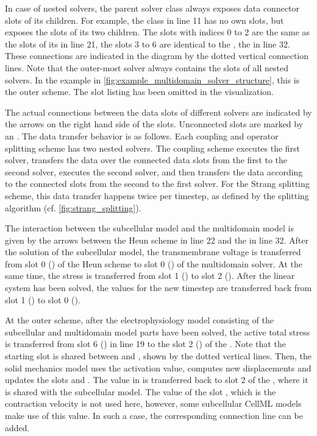 In case of nested solvers, the parent solver class always exposes data connector slots of its children. For example, the  class in line 11 has no own slots, but exposes the slots of its two children. The slots with indices 0 to 2 are the same as the slots of its  in line 21, the slots 3 to 6 are identical to the , the  in line 32. These connections are indicated in the diagram by the dotted vertical connection lines.
Note that the outer-most solver always contains the slots of all nested solvers. In the example in \cref{fig:example_multidomain_solver_structure}, this is the outer  scheme. The slot listing has been omitted in the visualization.

The actual connections between the data slots of different solvers are indicated by the arrows on the right hand side of the slots. Unconnected slots are marked by an .
The data transfer behavior is as follows. Each coupling and operator splitting scheme has two nested solvers. The coupling scheme executes the first solver, transfers the data over the connected data slots from the first to the second solver, executes the second solver, and then transfers the data according to the connected slots from the second to the first solver. For the Strang splitting scheme, this data transfer happens twice per timestep, as defined by the splitting algorithm (cf. \cref{fig:strang_splitting}).

The interaction between the subcellular model and the multidomain model is given by the arrows between the Heun scheme in line 22 and the  in line 32. After the solution of the subcellular model, the transmembrane voltage is transferred from slot 0 () of the Heun scheme to slot 0 () of the multidomain solver. At the same time, the stress is transferred from slot 1 () to slot 2 (). After the linear system has been solved, the values for the new timestep are transferred back from slot 1 () to slot 0 ().

At the outer  scheme, after the electrophysiology model consisting of the subcellular and multidomain model parts have been solved, the active total stress is transferred from slot 6 () in line 19 to the slot 2 () of the . Note that the starting slot  is shared between  and , shown by the dotted vertical lines. Then, the solid mechanics model uses the activation value, computes new displacements and updates the slots  and . The value in  is transferred back to slot 2 of the , where it is shared with the subcellular model. The value of the slot , which is the contraction velocity is not used here, however, some subcellular CellML models make use of this value. In such a case, the corresponding connection line can be added.

